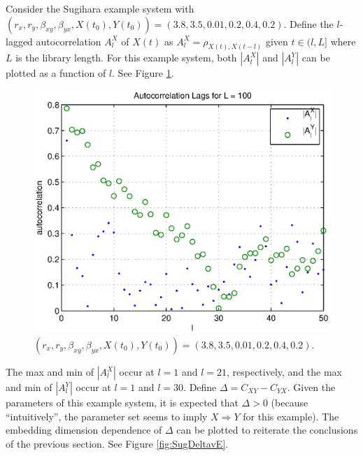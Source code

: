 \documentclass[a4paper,11pt]{article}
\begin{document}
Consider the Sugihara example system with $\left(r_x,r_y,\beta_{xy},\beta_{yx},X(t_0),Y(t_0)\right) = \left(3.8,3.5,0.01,0.2,0.4,0.2\right)$.  Define the $l$-lagged autocorrelation $A_l^X$ of $X(t)$ as $A_l^X=\rho_{X(t),X(t-l)}$ given $t\in(l,L]$ where $L$ is the library length.  For this example system, both $|A_l^X|$ and $|A_l^Y|$ can be plotted as a function of $l$.  See Figure \ref{fig:autocorrSug}.
\begin{figure}[h!t]
\centering
\label{fig:autocorrSug}
\includegraphics[scale=0.55]{graphics/autocorrSug.eps}
\caption{$\left(r_x,r_y,\beta_{xy},\beta_{yx},X(t_0),Y(t_0)\right) = \left(3.8,3.5,0.01,0.2,0.4,0.2\right)$.}
\end{figure}
The max and min of $|A_l^X|$ occur at $l=1$ and $l=21$, respectively, and the  max and min of $|A_l^Y|$ occur at $l=1$ and $l=30$.  Define $\Delta=C_{XY}-C_{YX}$.  Given the parameters of this example system, it is expected that $\Delta>0$ (because ``intuitively'', the parameter set seems to imply $X\Rightarrow Y$ for this example).  The embedding dimension dependence of $\Delta$ can be plotted to reiterate the conclusions of the previous section.  See Figure \ref{fig:SugDeltavE}.
\end{document}

